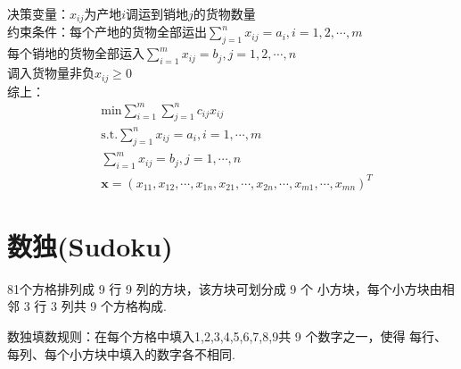 \documentclass[10t, a4paper, oneside]{ctexbook}
\begin{document}
决策变量：$x_{ij}$为产地$i$调运到销地$j$的货物数量\\
约束条件：每个产地的货物全部运出$\sum_{j = 1}^nx_{ij} = a_i, i = 1,2,\cdots, m$\\
每个销地的货物全部运入$\sum_{i = 1}^m x_{ij} = b_j, j = 1,2,\cdots,n$\\
调入货物量非负$x_{ij} \ge 0$\\
综上：
$$\begin{aligned}
    &\text{min} \sum_{i=1}^{m}\sum_{j=1}^{n}c_{ij}x_{ij}  \\
    &\text{s.t.} \sum_{j=1}^{n}x_{ij}=a_{i},i=1,\cdots,m  \\
    &\sum_{i=1}^{m}x_{ij}=b_{j},j=1,\cdots,n \\
    &\mathbf{x}=\left(x_{11},x_{12},\cdots,x_{1n},x_{21},\cdots,x_{2n},\cdots,x_{m1},\cdots,x_{mn}\right)^{T}
    \end{aligned}$$
\section{数独(Sudoku)}
81个方格排列成 9 行 9 列的方块，该方块可划分成 9 个
小方块，每个小方块由相邻 3 行 3 列共 9 个方格构成.

数独填数规则：在每个方格中填入1,2,3,4,5,6,7,8,9共 9 个数字之一，使得
每行、每列、每个小方块中填入的数字各不相同.
\end{document}
